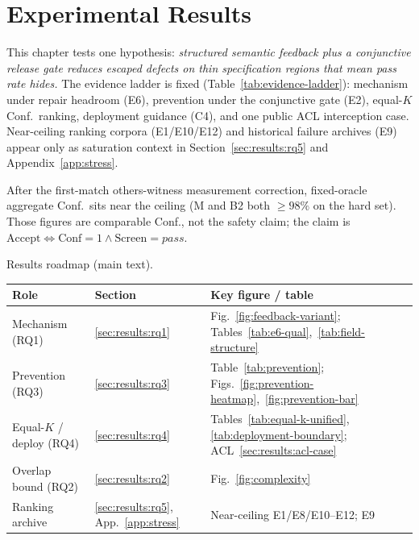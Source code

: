 
\chapter{Experimental Results}
\label{ch:results}

This chapter tests one hypothesis:
\emph{structured semantic feedback plus a conjunctive release gate reduces
escaped defects on thin specification regions that mean pass rate hides.}
The evidence ladder is fixed (Table~\ref{tab:evidence-ladder}):
mechanism under repair headroom (E6), prevention under the conjunctive gate
(E2), equal-$K$ Conf.\ ranking, deployment guidance (C4), and one public ACL
interception case.
Near-ceiling ranking corpora (E1/E10/E12) and historical failure archives (E9)
appear only as saturation context in Section~\ref{sec:results:rq5} and
Appendix~\ref{app:stress}.

After the first-match others-witness measurement correction, fixed-oracle
aggregate Conf.\ sits near the ceiling (M and B2 both ${\ge}98\%$ on the hard
set).
Those figures are comparable Conf., not the safety claim; the claim is
$\mathrm{Accept}\Leftrightarrow\mathrm{Conf}{=}1\wedge\mathrm{Screen}{=}\mathit{pass}$.

\begin{inlinetable}{Results roadmap (main text).}
  \label{tab:results-roadmap}
  \footnotesize
  \begin{tabular}{lll}
    \toprule
    Role & Section & Key figure / table \\
    \midrule
    Mechanism (RQ1) & \ref{sec:results:rq1} & Fig.~\ref{fig:feedback-variant};
      Tables~\ref{tab:e6-qual},~\ref{tab:field-structure} \\
    Prevention (RQ3) & \ref{sec:results:rq3} & Table~\ref{tab:prevention};
      Figs.~\ref{fig:prevention-heatmap},~\ref{fig:prevention-bar} \\
    Equal-$K$ / deploy (RQ4) & \ref{sec:results:rq4} & Tables~\ref{tab:equal-k-unified},
      \ref{tab:deployment-boundary}; ACL~\ref{sec:results:acl-case} \\
    Overlap bound (RQ2) & \ref{sec:results:rq2} & Fig.~\ref{fig:complexity} \\
    Ranking archive & \ref{sec:results:rq5}, App.~\ref{app:stress}
      & Near-ceiling E1/E8/E10--E12; E9 \\
    \bottomrule
  \end{tabular}
\end{inlinetable}

